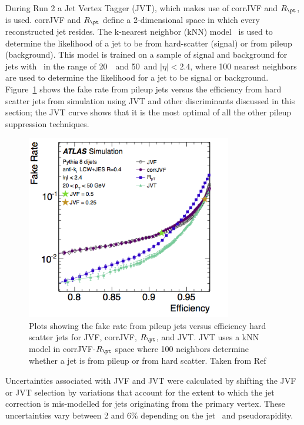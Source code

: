 \par During Run 2 a Jet Vertex Tagger (JVT), which makes use of corrJVF and $R_{\pt}$, 
 is used. corrJVF and $R_{\pt}$ define a 2-dimensional space in which every reconstructed 
jet resides. The k-nearest neighbor (kNN) model~\cite{citeulike:1164920} is used to determine 
the likelihood of a jet to be from hard-scatter (signal) or from pileup (background). This 
model is trained on a sample of signal and background for jets with \pt\ in the range of 
20~\GeV\ and 50~\GeV and $|\eta|<2.4$, where 100 nearest neighbors are used to determine 
the likelihood for a jet to be signal or background. Figure~\ref{fig:jvtROC} shows the fake rate 
from pileup jets versus the efficiency from hard scatter jets from simulation using JVT and other 
discriminants discussed in this section; the JVT curve shows that it is the most optimal of all 
the other pileup suppression techniques. 

\begin{figure}[!h]
\centering
   \includegraphics[width=0.8\textwidth]{figures/jvtROC.png}
\caption{Plots showing the fake rate from pileup jets versus efficiency hard scatter jets for JVF, corrJVF, $R_{\pt}$,
and JVT. JVT uses a kNN model in corrJVF-$R_{\pt}$ space where 100 neighbors determine whether a jet is 
from pileup or from hard scatter. Taken from Ref~\cite{Aad:2015ina}}
	\label{fig:jvtROC}
\end{figure}

\par Uncertainties associated with JVF and JVT were calculated by shifting the JVF or JVT selection by 
variations that account for the extent to which the jet correction is mis-modelled for jets 
originating from the primary vertex. These uncertainties vary between 2 and 6\% depending on the 
jet \pt\ and pseudorapidity. 

